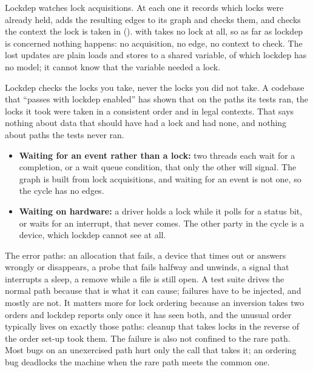 
 Lockdep watches lock acquisitions. At each one it records which locks were already held,
adds the resulting edges to its graph and checks them, and checks the context the lock is taken in
().  with  takes no lock at all, so as far as lockdep
is concerned nothing happens: no acquisition, no edge, no context to check. The lost updates are
plain loads and stores to a shared variable, of which lockdep has no model; it cannot know that the
variable needed a lock.

 Lockdep checks the locks you take, never the locks you did not take. A codebase that
``passes with lockdep enabled'' has shown that on the paths its tests ran, the locks it took were
taken in a consistent order and in legal contexts. That says nothing about data that should have
had a lock and had none, and nothing about paths the tests never ran.

\begin{itemize}
  \item \textbf{Waiting for an event rather than a lock:} two threads each wait for a completion,
    or a wait queue condition, that only the other will signal. The graph is built from lock
    acquisitions, and waiting for an event is not one, so the cycle has no edges.
  \item \textbf{Waiting on hardware:} a driver holds a lock while it polls for a status bit, or
    waits for an interrupt, that never comes. The other party in the cycle is a device, which
    lockdep cannot see at all.
\end{itemize}

 The error paths: an allocation that fails, a device that times out or answers wrongly or
disappears, a probe that fails halfway and unwinds, a signal that interrupts a sleep, a remove while
a file is still open. A test suite drives the normal path because that is what it can cause;
failures have to be injected, and mostly are not. It matters more for lock ordering because an
inversion takes two orders and lockdep reports only once it has seen both, and the unusual order
typically lives on exactly those paths: cleanup that takes locks in the reverse of the order set-up
took them. The failure is also not confined to the rare path. Most bugs on an unexercised path hurt
only the call that takes it; an ordering bug deadlocks the machine when the rare path meets the
common one.

